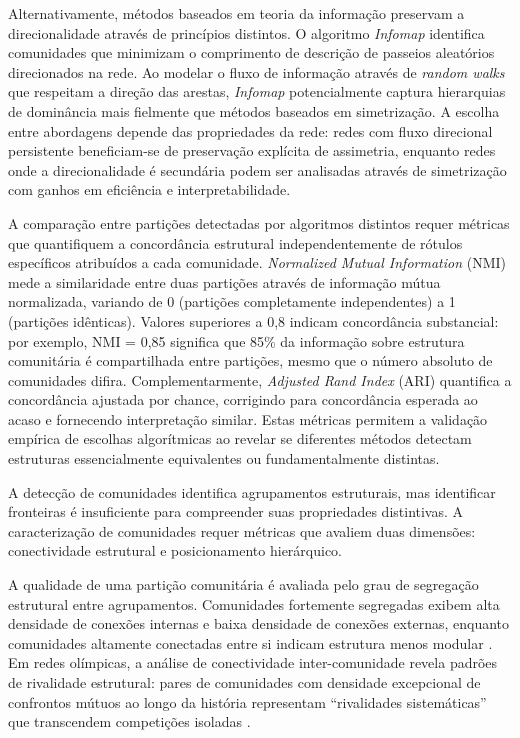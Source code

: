 Alternativamente, métodos baseados em teoria da informação preservam a direcionalidade através de princípios distintos. O algoritmo \textit{Infomap} \cite{Rosvall2008Infomap} identifica comunidades que minimizam o comprimento de descrição de passeios aleatórios direcionados na rede. Ao modelar o fluxo de informação através de \textit{random walks} que respeitam a direção das arestas, \textit{Infomap} potencialmente captura hierarquias de dominância mais fielmente que métodos baseados em simetrização. A escolha entre abordagens depende das propriedades da rede: redes com fluxo direcional persistente beneficiam-se de preservação explícita de assimetria, enquanto redes onde a direcionalidade é secundária podem ser analisadas através de simetrização com ganhos em eficiência e interpretabilidade.

A comparação entre partições detectadas por algoritmos distintos requer métricas que quantifiquem a concordância estrutural independentemente de rótulos específicos atribuídos a cada comunidade. \textit{Normalized Mutual Information} (NMI) \cite{Fortunato2010CommunityDetection} mede a similaridade entre duas partições através de informação mútua normalizada, variando de 0 (partições completamente independentes) a 1 (partições idênticas). Valores superiores a 0,8 indicam concordância substancial: por exemplo, NMI = 0,85 significa que 85\% da informação sobre estrutura comunitária é compartilhada entre partições, mesmo que o número absoluto de comunidades difira. Complementarmente, \textit{Adjusted Rand Index} (ARI) quantifica a concordância ajustada por chance, corrigindo para concordância esperada ao acaso e fornecendo interpretação similar. Estas métricas permitem a validação empírica de escolhas algorítmicas ao revelar se diferentes métodos detectam estruturas essencialmente equivalentes ou fundamentalmente distintas.

A detecção de comunidades identifica agrupamentos estruturais, mas identificar fronteiras é insuficiente para compreender suas propriedades distintivas. A caracterização de comunidades requer métricas que avaliem duas dimensões: conectividade estrutural e posicionamento hierárquico.

A qualidade de uma partição comunitária é avaliada pelo grau de segregação estrutural entre agrupamentos. Comunidades fortemente segregadas exibem alta densidade de conexões internas e baixa densidade de conexões externas, enquanto comunidades altamente conectadas entre si indicam estrutura menos modular \cite{Fortunato2010CommunityDetection}. Em redes olímpicas, a análise de conectividade inter-comunidade revela padrões de rivalidade estrutural: pares de comunidades com densidade excepcional de confrontos mútuos ao longo da história representam ``rivalidades sistemáticas'' que transcendem competições isoladas \cite{Leicht2008CommunityStructure}.

